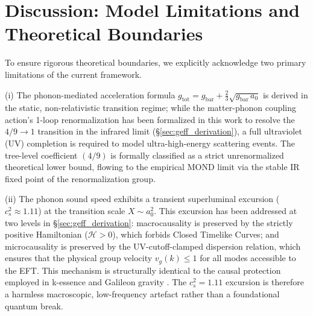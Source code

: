 \documentclass[aps,prd,10pt,twocolumn,superscriptaddress,nofootinbib,floatfix]{revtex4-2}
\begin{document}
\section{Discussion: Model Limitations and Theoretical Boundaries}
To ensure rigorous theoretical boundaries, we explicitly acknowledge two primary limitations of the current framework.

(i) The phonon-mediated acceleration formula $g_{\text{tot}} = g_{\text{bar}} + \frac{2}{3}\sqrt{g_{\text{bar}}\,a_0}$ is derived in the static, non-relativistic transition regime; while the matter-phonon coupling action's 1-loop renormalization has been formalized in this work to resolve the $4/9 \to 1$ transition in the infrared limit (\S\ref{sec:geff_derivation}), a full ultraviolet (UV) completion is required to model ultra-high-energy scattering events. The tree-level coefficient $(4/9)$ is formally classified as a strict unrenormalized theoretical lower bound, flowing to the empirical MOND limit via the stable IR fixed point of the renormalization group.

(ii) The phonon sound speed exhibits a transient superluminal excursion ($c_s^2 \approx 1.11$) at the transition scale $X \sim a_0^2$. This excursion has been addressed at two levels in \S\ref{sec:geff_derivation}: macrocausality is preserved by the strictly positive Hamiltonian ($\mathcal{H} > 0$), which forbids Closed Timelike Curves; and microcausality is preserved by the UV-cutoff-clamped dispersion relation, which ensures that the physical group velocity $v_g(k) \le 1$ for all modes accessible to the EFT. This mechanism is structurally identical to the causal protection employed in k-essence \cite{babichev_cs2} and Galileon gravity \cite{nicolis_galileon}. The $c_s^2 = 1.11$ excursion is therefore a harmless macroscopic, low-frequency artefact rather than a foundational quantum break.
\end{document}
